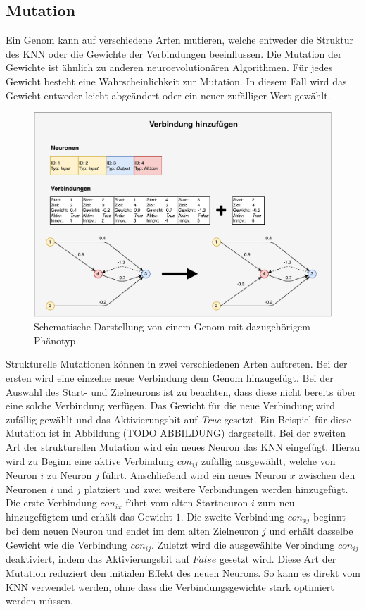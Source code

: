 \subsection{Mutation}
\label{subsec:neat_mutation}
Ein Genom kann auf verschiedene Arten mutieren, welche entweder die Struktur des \ac{KNN} oder die Gewichte der Verbindungen beeinflussen. Die Mutation der Gewichte ist ähnlich zu anderen neuroevolutionären Algorithmen. Für jedes Gewicht besteht eine Wahrscheinlichkeit zur Mutation. In diesem Fall wird das Gewicht entweder leicht abgeändert oder ein neuer zufälliger Wert gewählt.\\ %
\begin{figure}[!h]
	\centering
	\includegraphics[width=1\textwidth]{./img/neat-AddConnectionMutation.pdf} 
	\caption{Schematische Darstellung von einem Genom mit dazugehörigem Phänotyp}
	\label{fig:neat_add_connectin_mutation}
\end{figure}
Strukturelle Mutationen können in zwei verschiedenen Arten auftreten. Bei der ersten wird eine einzelne neue Verbindung dem Genom hinzugefügt. Bei der Auswahl des Start- und Zielneurons ist zu beachten, dass diese nicht bereits über eine solche Verbindung verfügen. Das Gewicht für die neue Verbindung wird zufällig gewählt und das Aktivierungsbit auf \emph{True} gesetzt. Ein Beispiel für diese Mutation ist in Abbildung (TODO ABBILDUNG) dargestellt. Bei der zweiten Art der strukturellen Mutation wird ein neues Neuron das \ac{KNN} eingefügt. Hierzu wird zu Beginn eine aktive Verbindung $con_{ij} $ zufällig ausgewählt, welche von Neuron $i$ zu Neuron $j$ führt. Anschließend wird ein neues Neuron $x$ zwischen den Neuronen $i$ und $j$ platziert und zwei weitere Verbindungen werden hinzugefügt. Die erste Verbindung $con_{ix}$ führt vom alten Startneuron $i$ zum neu hinzugefügtem und erhält das Gewicht $1$. Die zweite Verbindung $con_{xj}$ beginnt bei dem neuen Neuron und endet im dem alten Zielneuron $j$ und erhält dasselbe Gewicht wie die Verbindung $con_{ij}$. Zuletzt wird die ausgewählte Verbindung $con_{ij}$ deaktiviert, indem das Aktivierungsbit auf $False$ gesetzt wird. Diese Art der Mutation reduziert den initialen Effekt des neuen Neurons. So kann es direkt vom \ac{KNN} verwendet werden, ohne dass die Verbindungsgewichte stark optimiert werden müssen.

